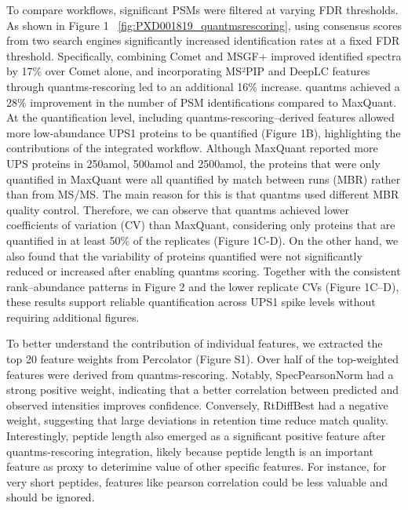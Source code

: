 \documentclass[12pt]{article}
\begin{document}
To compare workflows, significant PSMs were filtered at varying FDR thresholds. As shown in Figure 1 ~\ref{fig:PXD001819_quantmsrescoring}, using consensus scores from two search engines significantly increased identification rates at a fixed FDR threshold. Specifically, combining Comet and MSGF+ improved identified spectra by 17\% over Comet alone, and incorporating MS²PIP and DeepLC features through quantms-rescoring led to an additional 16\% increase. quantms achieved a 28\% improvement in the number of PSM identifications compared to MaxQuant. At the quantification level, including quantms-rescoring–derived features allowed more low-abundance UPS1 proteins to be quantified (Figure 1B), highlighting the contributions of the integrated workflow. Although MaxQuant reported more UPS proteins in 250amol, 500amol and 2500amol, the proteins that were only quantified in MaxQuant were all quantified by match between runs (MBR) rather than from MS/MS. The main reason for this is that quantms used different MBR quality control. Therefore, we can observe that quantms achieved lower coefficients of variation (CV) than MaxQuant, considering only proteins that are quantified in at least 50\% of the replicates (Figure 1C-D). On the other hand, we also found that the variability of proteins quantified were not significantly reduced or increased after enabling quantms scoring. Together with the consistent rank–abundance patterns in Figure 2 and the lower replicate CVs (Figure 1C–D), these results support reliable quantification across UPS1 spike levels without requiring additional figures.

To better understand the contribution of individual features, we extracted the top 20 feature weights from Percolator (Figure S1). Over half of the top-weighted features were derived from quantms-rescoring. Notably, SpecPearsonNorm had a strong positive weight, indicating that a better correlation between predicted and observed intensities improves confidence. Conversely, RtDiffBest had a negative weight, suggesting that large deviations in retention time reduce match quality. Interestingly, peptide length also emerged as a significant positive feature after quantms-rescoring integration, likely because peptide length is an important feature as proxy to deterimine value of other specific features. For instance, for very short peptides, features like pearson correlation could be less valuable and should be ignored.
\end{document}
